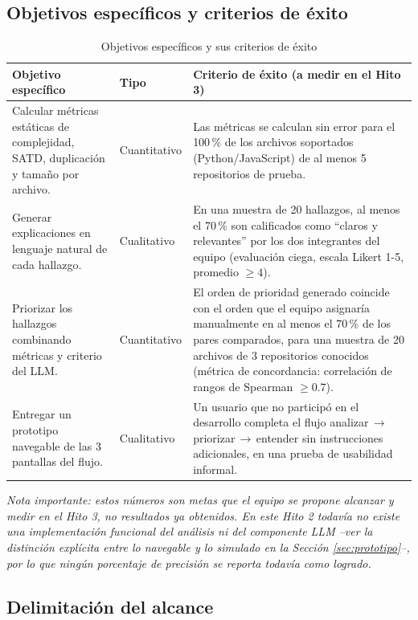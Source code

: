 \subsection{Objetivos específicos y criterios de éxito}

\begin{table}[H]
\centering
\caption{Objetivos específicos y sus criterios de éxito}
\label{tab:objetivos}
\begin{tabular}{p{} p{} p{}}
\toprule
\textbf{Objetivo específico} & \textbf{Tipo} & \textbf{Criterio de éxito (a medir en el Hito 3)} \\
\midrule
Calcular métricas estáticas de complejidad, SATD, duplicación y tamaño por archivo. & Cuantitativo & Las métricas se calculan sin error para el 100\,\% de los archivos soportados (Python/JavaScript) de al menos 5 repositorios de prueba. \\[4pt]
Generar explicaciones en lenguaje natural de cada hallazgo. & Cualitativo & En una muestra de 20 hallazgos, al menos el 70\,\% son calificados como ``claros y relevantes'' por los dos integrantes del equipo (evaluación ciega, escala Likert 1-5, promedio $\geq 4$). \\[4pt]
Priorizar los hallazgos combinando métricas y criterio del LLM. & Cuantitativo & El orden de prioridad generado coincide con el orden que el equipo asignaría manualmente en al menos el 70\,\% de los pares comparados, para una muestra de 20 archivos de 3 repositorios conocidos (métrica de concordancia: correlación de rangos de Spearman $\geq 0.7$). \\[4pt]
Entregar un prototipo navegable de las 3 pantallas del flujo. & Cualitativo & Un usuario que no participó en el desarrollo completa el flujo analizar\,$\to$\,priorizar\,$\to$\,entender sin instrucciones adicionales, en una prueba de usabilidad informal. \\
\bottomrule
\end{tabular}
\end{table}

\textit{Nota importante: estos números son metas que el equipo se propone alcanzar y medir en el Hito 3, no resultados ya obtenidos. En este Hito 2 todavía no existe una implementación funcional del análisis ni del componente LLM --ver la distinción explícita entre lo navegable y lo simulado en la Sección \ref{sec:prototipo}--, por lo que ningún porcentaje de precisión se reporta todavía como logrado.}

\subsection{Delimitación del alcance}

